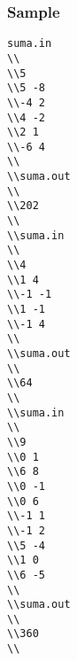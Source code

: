 \subsubsection{   Sample  }
\begin{verbatim}
suma.in 
\\
\\5 
\\5 -8 
\\-4 2 
\\4 -2 
\\2 1 
\\-6 4 
\\
\\suma.out 
\\
\\202 
\\
\\suma.in 
\\
\\4 
\\1 4 
\\-1 -1 
\\1 -1 
\\-1 4 
\\
\\suma.out 
\\
\\64
\\
\\suma.in 
\\
\\9 
\\0 1 
\\6 8 
\\0 -1 
\\0 6 
\\-1 1 
\\-1 2 
\\5 -4 
\\1 0 
\\6 -5 
\\
\\suma.out 
\\
\\360 
\\\end{verbatim}

